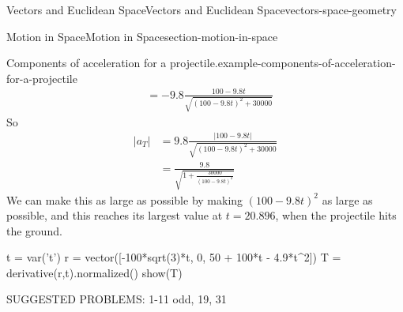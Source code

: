 \documentclass[oneside,10pt,]{book}
\numberwithin{equation}{section}
\begin{document}
\begin{chapterptx}{Vectors and Euclidean Space}{}{Vectors and Euclidean Space}{}{}{vectors-space-geometry}
\begin{sectionptx}{Motion in Space}{}{Motion in Space}{}{}{section-motion-in-space}
\begin{example}{Components of acceleration for a projectile.}{example-components-of-acceleration-for-a-projectile}
\begin{align*}
& =  -9.8\frac{100 - 9.8t}{\sqrt{(100-9.8t)^{2}+30000}}
\end{align*}
\hypertarget{p-1324}{}%
So%
%
\begin{align*}
|a_{T}| & = 9.8\frac{|100 - 9.8t|}{\sqrt{(100-9.8t)^{2}+30000}} \\
& = \frac{9.8}{\sqrt{1+\frac{30000}{(100-9.8t)^{2}}}} 
\end{align*}
\hypertarget{p-1325}{}%
We can make this as large as possible by making \((100-9.8t)^{2}\) as large as possible, and this reaches its largest value at \(t = 20.896\), when the projectile hits the ground.%
\end{example}
\begin{sageinput}
t = var('t')
r = vector([-100*sqrt(3)*t, 0, 50 + 100*t - 4.9*t^2])
T = derivative(r,t).normalized()
show(T)
\end{sageinput}
\hypertarget{p-1326}{}%
SUGGESTED PROBLEMS: 1-11 odd, 19, 31%
\end{sectionptx}
\end{chapterptx}
%
%
\typeout{************************************************}
\typeout{************************************************}
%
\end{document}
